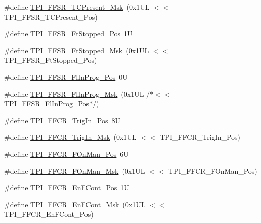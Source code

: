 \begin{DoxyCompactItemize}
\item 
\#define \mbox{\hyperlink{group___c_m_s_i_s___t_p_i_ga0d6bfd263ff2fdec72d6ec9415fb1135}{T\+P\+I\+\_\+\+F\+F\+S\+R\+\_\+\+T\+C\+Present\+\_\+\+Msk}}~(0x1\+U\+L $<$$<$ T\+P\+I\+\_\+\+F\+F\+S\+R\+\_\+\+T\+C\+Present\+\_\+\+Pos)
\item 
\#define \mbox{\hyperlink{group___c_m_s_i_s___t_p_i_gaedf31fd453a878021b542b644e2869d2}{T\+P\+I\+\_\+\+F\+F\+S\+R\+\_\+\+Ft\+Stopped\+\_\+\+Pos}}~1U
\item 
\#define \mbox{\hyperlink{group___c_m_s_i_s___t_p_i_ga1ab6c3abe1cf6311ee07e7c479ce5f78}{T\+P\+I\+\_\+\+F\+F\+S\+R\+\_\+\+Ft\+Stopped\+\_\+\+Msk}}~(0x1\+U\+L $<$$<$ T\+P\+I\+\_\+\+F\+F\+S\+R\+\_\+\+Ft\+Stopped\+\_\+\+Pos)
\item 
\#define \mbox{\hyperlink{group___c_m_s_i_s___t_p_i_ga542ca74a081588273e6d5275ba5da6bf}{T\+P\+I\+\_\+\+F\+F\+S\+R\+\_\+\+Fl\+In\+Prog\+\_\+\+Pos}}~0U
\item 
\#define \mbox{\hyperlink{group___c_m_s_i_s___t_p_i_ga63dfb09259893958962914fc3a9e3824}{T\+P\+I\+\_\+\+F\+F\+S\+R\+\_\+\+Fl\+In\+Prog\+\_\+\+Msk}}~(0x1\+U\+L /$\ast$$<$$<$ T\+P\+I\+\_\+\+F\+F\+S\+R\+\_\+\+Fl\+In\+Prog\+\_\+\+Pos$\ast$/)
\item 
\#define \mbox{\hyperlink{group___c_m_s_i_s___t_p_i_gaa7ea11ba6ea75b541cd82e185c725b5b}{T\+P\+I\+\_\+\+F\+F\+C\+R\+\_\+\+Trig\+In\+\_\+\+Pos}}~8U
\item 
\#define \mbox{\hyperlink{group___c_m_s_i_s___t_p_i_ga360b413bc5da61f751546a7133c3e4dd}{T\+P\+I\+\_\+\+F\+F\+C\+R\+\_\+\+Trig\+In\+\_\+\+Msk}}~(0x1\+U\+L $<$$<$ T\+P\+I\+\_\+\+F\+F\+C\+R\+\_\+\+Trig\+In\+\_\+\+Pos)
\item 
\#define \mbox{\hyperlink{group___c_m_s_i_s___t_p_i_gac57b0b588a37a870573560bc6316cbcc}{T\+P\+I\+\_\+\+F\+F\+C\+R\+\_\+\+F\+On\+Man\+\_\+\+Pos}}~6U
\item 
\#define \mbox{\hyperlink{group___c_m_s_i_s___t_p_i_ga7aeb30af62d04e852a55c3bd64c1bd2c}{T\+P\+I\+\_\+\+F\+F\+C\+R\+\_\+\+F\+On\+Man\+\_\+\+Msk}}~(0x1\+U\+L $<$$<$ T\+P\+I\+\_\+\+F\+F\+C\+R\+\_\+\+F\+On\+Man\+\_\+\+Pos)
\item 
\#define \mbox{\hyperlink{group___c_m_s_i_s___t_p_i_ga99e58a0960b275a773b245e2b69b9a64}{T\+P\+I\+\_\+\+F\+F\+C\+R\+\_\+\+En\+F\+Cont\+\_\+\+Pos}}~1U
\item 
\#define \mbox{\hyperlink{group___c_m_s_i_s___t_p_i_ga27d1ecf2e0ff496df03457a2a97cb2c9}{T\+P\+I\+\_\+\+F\+F\+C\+R\+\_\+\+En\+F\+Cont\+\_\+\+Msk}}~(0x1\+U\+L $<$$<$ T\+P\+I\+\_\+\+F\+F\+C\+R\+\_\+\+En\+F\+Cont\+\_\+\+Pos)
\item 
$$
\end{DoxyCompactItemize}

